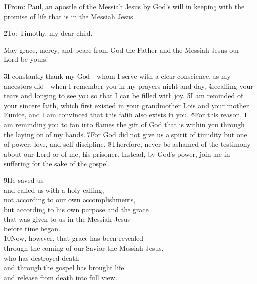 


\v{1}From: Paul, an apostle of the Messiah Jesus by God's will in keeping with the promise of life that is in the Messiah Jesus.

\v{2}To: Timothy, my dear child.

May grace, mercy, and peace from God the Father and the Messiah Jesus our Lord be yours!

\v{3}I constantly thank my God---whom I serve with a clear conscience, as my ancestors did---when I remember you in my prayers night and day, \v{4}recalling your tears and longing to see you so that I can be filled with joy. \v{5}I am reminded of your sincere faith, which first existed in your grandmother Lois and your mother Eunice, and I am convinced that this faith also exists in you. \v{6}For this reason, I am reminding you to fan into flames the gift of God that is within you through the laying on of my hands. \v{7}For God did not give us a spirit of timidity but one of power, love, and self-discipline. \v{8}Therefore, never be ashamed of the testimony about our Lord or of me, his prisoner. Instead, by God's power, join me in suffering for the sake of the gospel.

\begin{poetry}
\poeml \v{9}He saved us \\
\poemll    and called us with a holy calling, \\
\poeml not according to our own accomplishments, \\
\poemll    but according to his own purpose and the grace \\
\poeml that was given to us in the Messiah Jesus \\
\poemll    before time began. \\
\poeml \v{10}Now, however, that grace has been revealed \\
\poemll    through the coming of our Savior the Messiah Jesus, \\
\poeml who has destroyed death \\
\poemll    and through the gospel has brought life \\
\poemlll       and release from death into full view.
\end{poetry}

